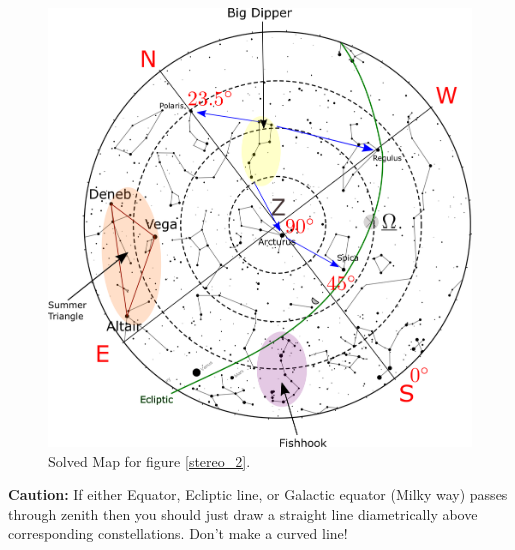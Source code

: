 \documentclass[a4paper,12pt]{extarticle}
\begin{document}
\begin{figure}[H]
    \centering
    \includegraphics[width=0.8\linewidth]{solved_map1.png}
    \caption{Solved Map for figure \ref{stereo_2}.}
    \label{stereo_3}
\end{figure}
\begin{defi}
	{\color{red}\textbf{Caution:}} If either Equator, Ecliptic line, or Galactic equator (Milky way) passes through zenith then you should just draw a straight line diametrically above corresponding constellations. Don't make a curved line!
\end{defi}
\end{document}
